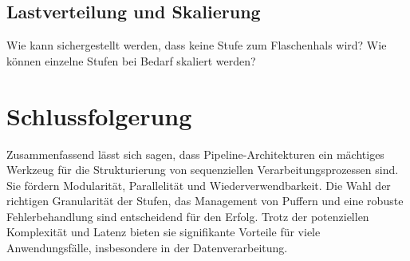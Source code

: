 \documentclass[a4paper]{article} %
\begin{document}
\subsection{Lastverteilung und Skalierung}
Wie kann sichergestellt werden, dass keine Stufe zum Flaschenhals wird? Wie können einzelne Stufen bei Bedarf skaliert werden?
\lipsum[23-25]
\blindtext[2]


\section{Schlussfolgerung}
Zusammenfassend lässt sich sagen, dass Pipeline-Architekturen ein mächtiges Werkzeug für die Strukturierung von sequenziellen Verarbeitungsprozessen sind. Sie fördern Modularität, Parallelität und Wiederverwendbarkeit. Die Wahl der richtigen Granularität der Stufen, das Management von Puffern und eine robuste Fehlerbehandlung sind entscheidend für den Erfolg. Trotz der potenziellen Komplexität und Latenz bieten sie signifikante Vorteile für viele Anwendungsfälle, insbesondere in der Datenverarbeitung.
\lipsum[26-28]
\blindtext
\end{document}

